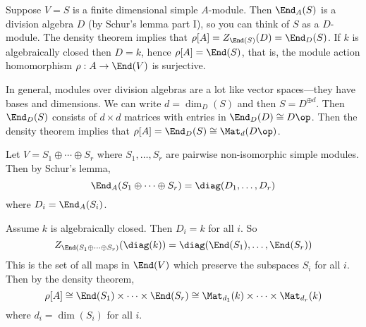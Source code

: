 \begin{exam}
	\begin{enum}
		\io
        Suppose $V=S$ is a finite dimensional simple $A$-module.
        Then $\End_A(S)$ is a division algebra $D$ (by Schur's lemma part I), so you can think of $S$ as a $D$-module.
        The density theorem implies that $\rho[A] = Z_{\End(S)}(D) = \End_D(S)$.        
        If $k$ is algebraically closed then $D=k$, hence $\rho[A] = \End(S)$, that is, the module action homomorphism $\rho:A \to \End(V)$ is surjective.
        
        In general, modules over division algebras are a lot like vector spaces---they have bases and dimensions.
        We can write $d = \dim_D(S)$ and then $S = D^{\oplus d}$.
		Then $\End_D(S)$ consists of $d \times d$ matrices with entries in $\End_D(D) \cong D\op$.
        Then the density theorem implies that $\rho[A] = \End_D(S) \cong \Mat_d(D\op)$.
        
        \io
        Let $V = S_1 \oplus \cdots \oplus S_r$ where $S_1,\ldots,S_r$ are pairwise non-isomorphic simple modules.
        Then by Schur's lemma,
        \[\End_A(S_1 \oplus \cdots \oplus S_r) = \diag(D_1,\ldots,D_r)\]
        where $D_i = \End_A(S_i)$.
        
        Assume $k$ is algebraically closed.
        Then $D_i = k$ for all $i$.
        So
        \[Z_{\End(S_1 \oplus \cdots \oplus S_r)}(\diag(k)) = \diag(\End(S_1),\ldots,\End(S_r))\]
        This is the set of all maps in $\End(V)$ which preserve the subspaces $S_i$ for all $i$.
        Then by the density theorem,
        \[\rho[A] \cong \End(S_1) \times \cdots \times \End(S_r) \cong \Mat_{d_1}(k) \times \cdots \times \Mat_{d_r}(k)\]
        where $d_i = \dim(S_i)$ for all $i$.
	\end{enum}
\end{exam}